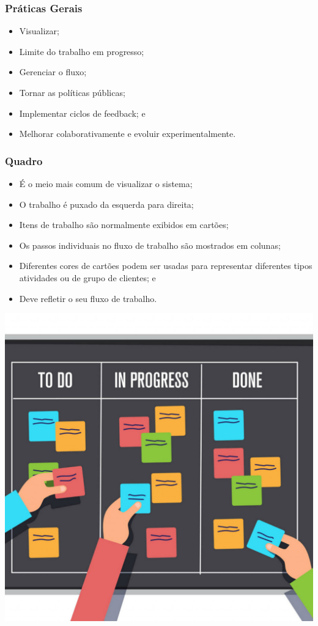 \documentclass[aspectratio=169]{beamer}
\begin{document}
\begin{frame}
	\frametitle{Práticas Gerais}
	
	\begin{itemize}
		\item Visualizar;
		\item Limite do trabalho em progresso;
		\item Gerenciar o fluxo;
		\item Tornar as políticas públicas;
		\item Implementar ciclos de feedback; e
		\item Melhorar colaborativamente e evoluir
experimentalmente.
	\end{itemize}
\end{frame}

\begin{frame}
	\frametitle{Quadro}
	
	\begin{itemize}
		\item É o meio mais comum de visualizar o sistema;
		\item O trabalho é puxado da esquerda para direita;
		\item Itens de trabalho são normalmente exibidos em cartões;
		\item Os passos individuais no fluxo de trabalho são mostrados em colunas;
		\item Diferentes cores de cartões podem ser usadas para representar diferentes tipos atividades ou de grupo de clientes; e
		\item Deve refletir o seu fluxo de trabalho.
	\end{itemize}\vfill
	
	\begin{center}
		\includegraphics[scale=0.13]{img/quadro}
	\end{center}
\end{frame}
\end{document}
